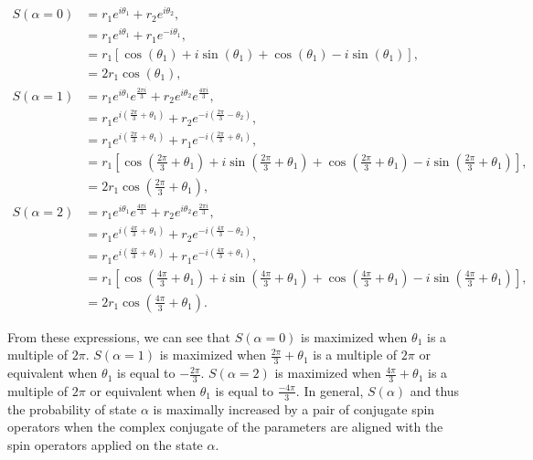 \begin{align*}
    S(\alpha=0) &= r_1 e^{i \theta_1} + r_2 e^{i \theta_2},\\
    &= r_1 e^{i \theta_1} + r_1 e^{-i \theta_1}, \\
    &= r_1 \left[ \cos\left( \theta_1 \right) + i \sin\left( \theta_1 \right) + \cos\left( \theta_1 \right) - i \sin\left( \theta_1 \right) \right],\\
    &= 2r_1 \cos\left( \theta_1 \right),\\
    S(\alpha=1) &= r_1 e^{i \theta_1} e^{\frac{2\pi i}{3}} + r_2 e^{i \theta_2} e^{\frac{4\pi i}{3}},\\
    &= r_1 e^{i\left( \frac{2\pi}{3} + \theta_1 \right)} + r_2 e^{-i \left(\frac{2\pi}{3} - \theta_2 \right)},\\
    &= r_1 e^{i\left( \frac{2\pi}{3} + \theta_1 \right)} + r_1 e^{-i \left(\frac{2\pi}{3} + \theta_1 \right)},\\
    &= r_1 \left[ \cos\left( \frac{2\pi}{3} + \theta_1 \right) + i \sin \left( \frac{2\pi}{3} + \theta_1 \right) + \cos\left( \frac{2\pi}{3} + \theta_1 \right) - i \sin \left( \frac{2\pi}{3} + \theta_1 \right) \right],\\
    &= 2 r_1 \cos\left( \frac{2\pi}{3} + \theta_1 \right),\\
    S(\alpha=2) &= r_1 e^{i \theta_1} e^{\frac{4\pi i}{3}} + r_2 e^{i \theta_2} e^{\frac{2\pi i}{3}},\\
    &= r_1 e^{i\left( \frac{4\pi}{3} + \theta_1 \right)} + r_2 e^{-i \left(\frac{4\pi}{3} - \theta_2 \right)},\\
    &= r_1 e^{i\left( \frac{4\pi}{3} + \theta_1 \right)} + r_1 e^{-i \left(\frac{4\pi}{3} + \theta_1 \right)},\\
    &= r_1 \left[ \cos\left( \frac{4\pi}{3} + \theta_1 \right) + i \sin \left( \frac{4\pi}{3} + \theta_1 \right) + \cos\left( \frac{4\pi}{3} + \theta_1 \right) - i \sin \left( \frac{4\pi}{3} + \theta_1 \right) \right],\\
    &= 2 r_1 \cos\left( \frac{4\pi}{3} + \theta_1 \right).
\end{align*}

\noindent 
From these expressions, we can see that $S(\alpha=0)$ is maximized when $\theta_1$ is a multiple of $2\pi$. $S(\alpha=1)$ is maximized when $\frac{2\pi}{3} + \theta_1$ is a multiple of $2\pi$ or equivalent when $\theta_1$ is equal to $-\frac{2\pi}{3}$.
$S(\alpha=2)$ is maximized when $\frac{4\pi}{3} + \theta_1$ is a multiple of $2\pi$ or equivalent when $\theta_1$ is equal to $\frac{-4\pi}{3}$.
In general, $S(\alpha)$ and thus the probability of state $\alpha$ is maximally increased by a pair of conjugate spin operators when the complex conjugate of the parameters are aligned with the spin operators applied on the state $\alpha$.

